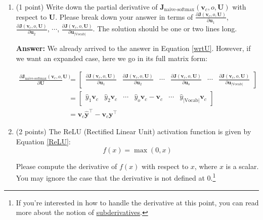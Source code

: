 \documentclass{article}
\newenvironment{answer}{
    {\bf Answer:} \sf \begingroup\color{red}
}{\endgroup}%
\begin{document}
\begin{enumerate}[label=(\alph*)]
\begin{shaded}
\begin{answer}
\end{answer}
\end{shaded}

\item (1 point) Write down the partial derivative of $\bm J_{\text{naive-softmax}}(\bm v_c, o, \bm U)$ with respect to $\bm U$. Please break down your answer in terms of $\frac{\partial \bm J(\bm v_c, o, \bm U)}{\partial \bm u_1}$, $\frac{\partial \bm J(\bm v_c, o, \bm U)}{\partial \bm u_2}$, $\cdots$, $\frac{\partial \bm J(\bm v_c, o, \bm U)}{\partial \bm u_{|\text{Vocab}|}}$. The solution should be one or two lines long.

\begin{shaded}
\begin{answer} We already arrived to the answer in Equation \ref{wrtU}. However, if we want an expanded case, here we go in its full matrix form:

\begin{align}
    \frac{\partial \bm J_{\text{naive-softmax}}(\bm v_c, o, \bm U)}{\partial \bm U} &=
    \begin{bmatrix}
        \frac{\partial \bm J(\bm v_c, o, \bm U)}{\partial \bm u_1} & 
        \frac{\partial \bm J(\bm v_c, o, \bm U)}{\partial \bm u_2} & 
        \cdots & \frac{\partial \bm J(\bm v_c, o, \bm U)}{\partial \bm u_o} & \cdots &
        \frac{\partial \bm J(\bm v_c, o, \bm U)}{\partial \bm u_{|\text{Vocab}|}}
    \end{bmatrix} \\
    &= \begin{bmatrix}
        \hat{y}_1 \bm v_c & 
        \hat{y}_2 \bm v_c & 
        \cdots & \hat{y}_o \bm v_c - \bm v_c & \cdots &
        \hat{y}_{|\text{Vocab}|} \bm v_c
    \end{bmatrix} \\
    &= \bm v_c \hat{\bm y}^{\top} - \bm v_c \bm y^{\top}
\end{align}

\end{answer}
\end{shaded}

\item (2 points) The ReLU (Rectified Linear Unit) activation function is given by Equation \ref{ReLU}:
\begin{equation}
    \label{ReLU}
    f(x) = \max(0, x)
\end{equation}

Please compute the derivative of $f(x)$ with respect to $x$, where $x$ is a scalar. You may ignore the case that the derivative is not defined at 0.\footnote{If you're interested in how to handle the derivative at this point, you can read more about the notion of \hyperref[https://en.wikipedia.org/wiki/Subderivative]{subderivatives}.}


\end{enumerate}
\end{document}
